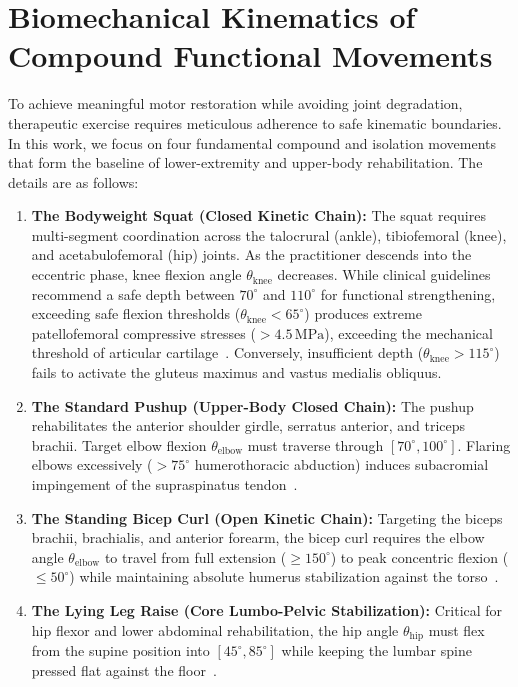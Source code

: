 \documentclass[12pt]{report}
\begin{document}
\section{Biomechanical Kinematics of Compound Functional Movements}
To achieve meaningful motor restoration while avoiding joint degradation, therapeutic exercise requires meticulous adherence to safe kinematic boundaries. In this work, we focus on four fundamental compound and isolation movements that form the baseline of lower-extremity and upper-body rehabilitation. The details are as follows:

\newpage
\begin{enumerate}[label={(\alph*)}]
    \item \textbf{The Bodyweight Squat (Closed Kinetic Chain):} The squat requires multi-segment coordination across the talocrural (ankle), tibiofemoral (knee), and acetabulofemoral (hip) joints. As the practitioner descends into the eccentric phase, knee flexion angle $\theta_{\text{knee}}$ decreases. While clinical guidelines recommend a safe depth between $70^\circ$ and $110^\circ$ for functional strengthening, exceeding safe flexion thresholds ($\theta_{\text{knee}} < 65^\circ$) produces extreme patellofemoral compressive stresses ($>4.5\,\text{MPa}$), exceeding the mechanical threshold of articular cartilage~\cite{escamilla2001knee, cotter2013knee}. Conversely, insufficient depth ($\theta_{\text{knee}} > 115^\circ$) fails to activate the gluteus maximus and vastus medialis obliquus.
    \item \textbf{The Standard Pushup (Upper-Body Closed Chain):} The pushup rehabilitates the anterior shoulder girdle, serratus anterior, and triceps brachii. Target elbow flexion $\theta_{\text{elbow}}$ must traverse through $[70^\circ, 100^\circ]$. Flaring elbows excessively ($>75^\circ$ humerothoracic abduction) induces subacromial impingement of the supraspinatus tendon~\cite{schoenfeld2010mechanisms}.
    \item \textbf{The Standing Bicep Curl (Open Kinetic Chain):} Targeting the biceps brachii, brachialis, and anterior forearm, the bicep curl requires the elbow angle $\theta_{\text{elbow}}$ to travel from full extension ($\ge 150^\circ$) to peak concentric flexion ($\le 50^\circ$) while maintaining absolute humerus stabilization against the torso~\cite{schoenfeld2010mechanisms}.
    \item \textbf{The Lying Leg Raise (Core Lumbo-Pelvic Stabilization):} Critical for hip flexor and lower abdominal rehabilitation, the hip angle $\theta_{\text{hip}}$ must flex from the supine position into $[45^\circ, 85^\circ]$ while keeping the lumbar spine pressed flat against the floor~\cite{powers2010influence}.
\end{enumerate}
\end{document}
